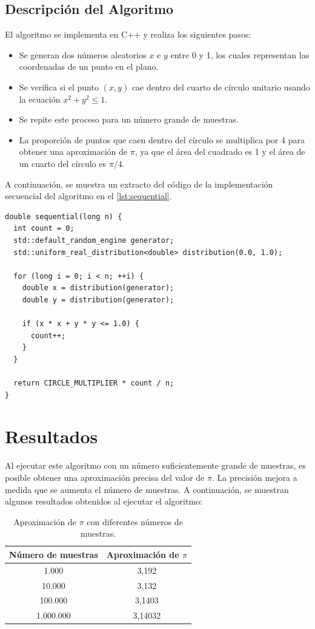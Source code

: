 \documentclass[a4paper, 10pt, onecolumn]{IEEEtran}
\begin{document}
\subsection{Descripción del Algoritmo}
El algoritmo se implementa en C++ y realiza los siguientes pasos:

\begin{itemize}
    \item Se generan dos números aleatorios $x$ e $y$ entre 0 y 1, los cuales representan las coordenadas de un punto en el plano.
    \item Se verifica si el punto $(x, y)$ cae dentro del cuarto de círculo unitario usando la ecuación $x^2 + y^2 \leq 1$.
    \item Se repite este proceso para un número grande de muestras.
    \item La proporción de puntos que caen dentro del círculo se multiplica por 4 para obtener una aproximación de $\pi$, ya que el área del cuadrado es 1 y el área de un cuarto del círculo es $\pi/4$.
\end{itemize}

A continuación, se muestra un extracto del código de la implementación secuencial del algoritmo en el \cref{lst:sequential}.

\begin{lstlisting}[caption={Implementación Secuencial de Monte Carlo en C++}, label={lst:sequential}]
double sequential(long n) {
  int count = 0;
  std::default_random_engine generator;
  std::uniform_real_distribution<double> distribution(0.0, 1.0);
  
  for (long i = 0; i < n; ++i) {
    double x = distribution(generator);
    double y = distribution(generator);
    
    if (x * x + y * y <= 1.0) {
      count++;
    }
  }
  
  return CIRCLE_MULTIPLIER * count / n;
}
\end{lstlisting}

\section{Resultados}
Al ejecutar este algoritmo con un número suficientemente grande de muestras, es posible obtener una aproximación precisa del valor de $\pi$. La precisión mejora a medida que se aumenta el número de muestras. A continuación, se muestran algunos resultados obtenidos al ejecutar el algoritmo:

\begin{table}[H]
    \centering
    \begin{tabular}{|c|c|}
    \hline
    \textbf{Número de muestras} & \textbf{Aproximación de $\pi$} \\
    \hline
    1.000 & 3,192 \\
    10.000 & 3,132 \\
    100.000 & 3,1403 \\
    1.000.000 & 3,14032 \\
    \hline
    \end{tabular}
    \caption{Aproximación de $\pi$ con diferentes números de muestras.}
    \label{tab:results}
\end{table}
\end{document}
